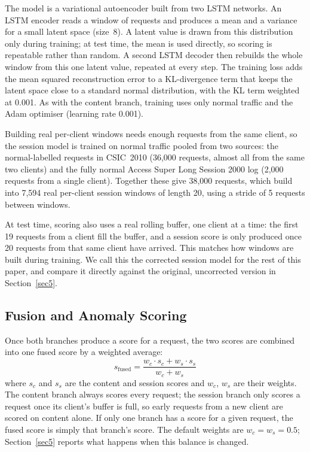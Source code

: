 \documentclass[futureinternet,article,submit,moreauthors]{Definitions/mdpi}
\begin{document}
The model is a variational autoencoder built from two LSTM networks. An LSTM encoder reads a window of requests and produces a mean and a variance for a small latent space (size~8). A latent value is drawn from this distribution only during training; at test time, the mean is used directly, so scoring is repeatable rather than random. A second LSTM decoder then rebuilds the whole window from this one latent value, repeated at every step. The training loss adds the mean squared reconstruction error to a KL-divergence term that keeps the latent space close to a standard normal distribution, with the KL term weighted at 0.001. As with the content branch, training uses only normal traffic and the Adam optimiser (learning rate 0.001).

Building real per-client windows needs enough requests from the same client, so the session model is trained on normal traffic pooled from two sources: the normal-labelled requests in CSIC~2010 (36{,}000 requests, almost all from the same two clients) and the fully normal Access Super Long Session 2000 log (2{,}000 requests from a single client). Together these give 38{,}000 requests, which build into 7{,}594 real per-client session windows of length 20, using a stride of 5 requests between windows.

At test time, scoring also uses a real rolling buffer, one client at a time: the first 19 requests from a client fill the buffer, and a session score is only produced once 20 requests from that same client have arrived. This matches how windows are built during training. We call this the corrected session model for the rest of this paper, and compare it directly against the original, uncorrected version in Section~\ref{sec5}.

\subsection{Fusion and Anomaly Scoring}

Once both branches produce a score for a request, the two scores are combined into one fused score by a weighted average:
\begin{equation}
s_{\text{fused}} = \frac{w_c \cdot s_c + w_s \cdot s_s}{w_c + w_s}
\end{equation}
where $s_c$ and $s_s$ are the content and session scores and $w_c$, $w_s$ are their weights. The content branch always scores every request; the session branch only scores a request once its client's buffer is full, so early requests from a new client are scored on content alone. If only one branch has a score for a given request, the fused score is simply that branch's score. The default weights are $w_c = w_s = 0.5$; Section~\ref{sec5} reports what happens when this balance is changed.
\end{document}
